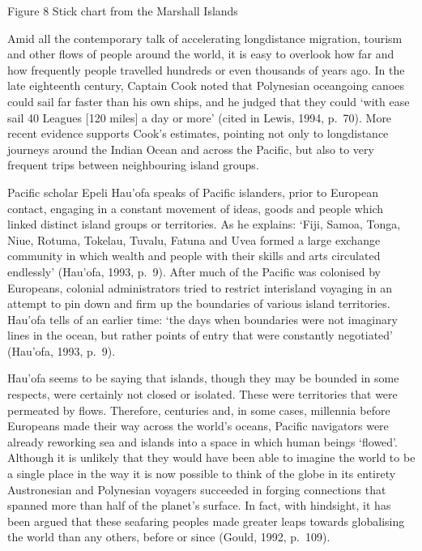 \documentclass[letterpaper,10pt,english]{sphinxmanual}
\let\sphinxpxdimen\pdfpxdimen\else\newdimen\sphinxpxdimen
\begin{document}
\sphinxincludegraphics[width=286\sphinxpxdimen,height=233\sphinxpxdimen]{{dd205_3_008i}.jpg}

Figure 8 Stick chart from the Marshall Islands

Amid all the contemporary talk of accelerating long\sphinxhyphen{}distance migration, tourism and other flows of people around the world, it is easy to overlook how far and how frequently people travelled hundreds or even thousands of years ago. In the late eighteenth century, Captain Cook noted that Polynesian ocean\sphinxhyphen{}going canoes could sail far faster than his own ships, and he judged that they could ‘with ease sail 40 Leagues {[}120 miles{]} a day or more’ (cited in Lewis, 1994, p. 70). More recent evidence
supports Cook’s estimates, pointing not only to long\sphinxhyphen{}distance journeys around the Indian Ocean and across the Pacific, but also to very frequent trips between neighbouring island groups.

Pacific scholar Epeli Hau’ofa speaks of Pacific islanders, prior to European contact, engaging in a constant movement of ideas, goods and people which linked distinct island groups or territories. As he explains: ‘Fiji, Samoa, Tonga, Niue, Rotuma, Tokelau, Tuvalu, Fatuna and Uvea formed a large exchange community in which wealth and people with their skills and arts circulated endlessly’ (Hau’ofa, 1993, p. 9). After much of the Pacific was colonised by Europeans, colonial administrators tried to
restrict inter\sphinxhyphen{}island voyaging in an attempt to pin down and firm up the boundaries of various island territories. Hau’ofa tells of an earlier time: ‘the days when boundaries were not imaginary lines in the ocean, but rather points of entry that were constantly negotiated’ (Hau’ofa, 1993, p. 9).

Hau’ofa seems to be saying that islands, though they may be bounded in some respects, were certainly not closed or isolated. These were territories that were permeated by flows. Therefore, centuries and, in some cases, millennia before Europeans made their way across the world’s oceans, Pacific navigators were already reworking sea and islands into a space in which human beings ‘flowed’. Although it is unlikely that they would have been able to imagine the world to be a single place \textendash{} in the way
it is now possible to think of the globe in its entirety \textendash{} Austronesian and Polynesian voyagers succeeded in forging connections that spanned more than half of the planet’s surface. In fact, with hindsight, it has been argued that these seafaring peoples made greater leaps towards globalising the world than any others, before or since (Gould, 1992, p. 109).
\end{document}
